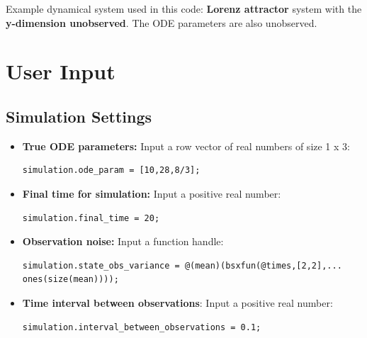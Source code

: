 Example dynamical system used in this code: \textbf{Lorenz attractor} system with the \textbf{y-dimension unobserved}. The ODE parameters are also unobserved.

\section{User Input}

\subsection{Simulation Settings}
\vspace{1em}
\begin{itemize}
\item \textbf{True ODE parameters:} Input a row vector of real numbers of size 1 x 3:
    \color{RoyalPurple}\begin{verbatim}
simulation.ode_param = [10,28,8/3];
\end{verbatim} 
\color{black}

\item \textbf{Final time for simulation:} Input a positive real number:
    \color{RoyalPurple}\begin{verbatim}
simulation.final_time = 20;
\end{verbatim} 
\color{black}

   \item \textbf{Observation noise:} Input a function handle:
    \color{RoyalPurple}\begin{verbatim}
simulation.state_obs_variance = @(mean)(bsxfun(@times,[2,2],...
ones(size(mean))));
\end{verbatim} 
\color{black}

   \item \textbf{Time interval between observations}: Input a positive real number:
    \color{RoyalPurple}\begin{verbatim}
simulation.interval_between_observations = 0.1;
\end{verbatim} 
\color{black}
\end{itemize}
\vspace{1em}


